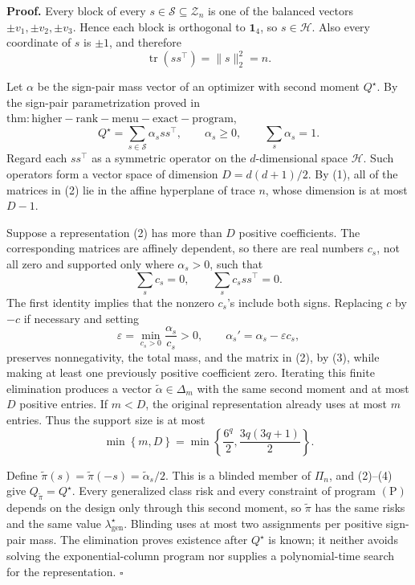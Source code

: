 \textbf{Proof.}
Every block of every \(s\in\mathscr S\subseteq\mathcal Z_n\) is one of the balanced vectors \(\pm v_1,\pm v_2,\pm v_3\).  Hence each block is orthogonal to \(\mathbf 1_4\), so \(s\in\mathcal H\).  Also every coordinate of \(s\) is \(\pm1\), and therefore
\[
\operatorname{tr}(ss^\top)=\|s\|_2^2=n.
\tag{1}
\]

Let \(\alpha\) be the sign-pair mass vector of an optimizer with second moment \(Q^\star\).  By the sign-pair parametrization proved in \(\mathrm{thm:higher-rank-menu-exact-program}\),
\[
Q^\star=\sum_{s\in\mathscr S}\alpha_s ss^\top,
\qquad
\alpha_s\ge0,
\qquad
\sum_s\alpha_s=1.
\tag{2}
\]
Regard each \(ss^\top\) as a symmetric operator on the \(d\)-dimensional space \(\mathcal H\).  Such operators form a vector space of dimension \(D=d(d+1)/2\).  By (1), all of the matrices in (2) lie in the affine hyperplane of trace \(n\), whose dimension is at most \(D-1\).

Suppose a representation (2) has more than \(D\) positive coefficients.  The corresponding matrices are affinely dependent, so there are real numbers \(c_s\), not all zero and supported only where \(\alpha_s>0\), such that
\[
\sum_s c_s=0,
\qquad
\sum_s c_s ss^\top=0.
\tag{3}
\]
The first identity implies that the nonzero \(c_s\)'s include both signs.  Replacing \(c\) by \(-c\) if necessary and setting
\[
\varepsilon=\min_{c_s>0}\frac{\alpha_s}{c_s}>0,
\qquad
\alpha_s'=\alpha_s-\varepsilon c_s,
\tag{4}
\]
preserves nonnegativity, the total mass, and the matrix in (2), by (3), while making at least one previously positive coefficient zero.  Iterating this finite elimination produces a vector \(\widetilde\alpha\in\Delta_m\) with the same second moment and at most \(D\) positive entries.  If \(m<D\), the original representation already uses at most \(m\) entries.  Thus the support size is at most
\[
\min\left\{m,D\right\}
=\min\left\{\frac{6^q}{2},\frac{3q(3q+1)}2\right\}.
\tag{5}
\]

Define \(\widetilde\pi(s)=\widetilde\pi(-s)=\widetilde\alpha_s/2\).  This is a blinded member of \(\Pi_n\), and (2)--(4) give \(Q_{\widetilde\pi}=Q^\star\).  Every generalized class risk and every constraint of program \((\mathrm P)\) depends on the design only through this second moment, so \(\widetilde\pi\) has the same risks and the same value \(\lambda_{\mathrm{gen}}^\star\).  Blinding uses at most two assignments per positive sign-pair mass.  The elimination proves existence after \(Q^\star\) is known; it neither avoids solving the exponential-column program nor supplies a polynomial-time search for the representation. \(\square\)